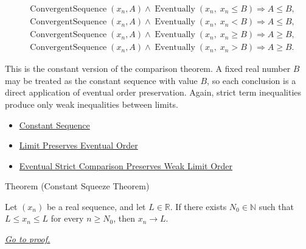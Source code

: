\begin{remark*}
\[
\begin{aligned}
&\operatorname{ConvergentSequence}(x_n,A)
\land
\operatorname{Eventually}(x_n,\;x_n\le B)
\Longrightarrow A\le B,\\
&\operatorname{ConvergentSequence}(x_n,A)
\land
\operatorname{Eventually}(x_n,\;x_n<B)
\Longrightarrow A\le B,\\
&\operatorname{ConvergentSequence}(x_n,A)
\land
\operatorname{Eventually}(x_n,\;x_n\ge B)
\Longrightarrow A\ge B,\\
&\operatorname{ConvergentSequence}(x_n,A)
\land
\operatorname{Eventually}(x_n,\;x_n>B)
\Longrightarrow A\ge B.
\end{aligned}
\]
\end{remark*}

\begin{remark*}[Interpretation]
This is the constant version of the comparison theorem. A fixed real number
$B$ may be treated as the constant sequence with value $B$, so each conclusion
is a direct application of eventual order preservation. Again, strict term
inequalities produce only weak inequalities between limits.
\end{remark*}

\begin{remark*}[Dependencies]
\begin{itemize}
  \item \hyperref[def:constant-sequence]{Constant Sequence}
  \item \hyperref[thm:limit-preserves-eventual-order]{Limit Preserves Eventual Order}
  \item \hyperref[thm:eventual-strict-comparison-preserves-weak-limit-order]{Eventual Strict Comparison Preserves Weak Limit Order}
\end{itemize}
\end{remark*}


\begin{theorembox}{Theorem (Constant Squeeze Theorem)}
\begin{theorem}
\label{thm:constant-squeeze-theorem}

Let $(x_n)$ be a real sequence, and let $L\in\mathbb{R}$. If there
exists $N_0\in\mathbb{N}$ such that $L\le x_n\le L$ for every
$n\ge N_0$, then $x_n\to L$.

\smallskip
\noindent
\hyperref[prf:constant-squeeze-theorem]{\textit{Go to proof.}}
\end{theorem}
\end{theorembox}

